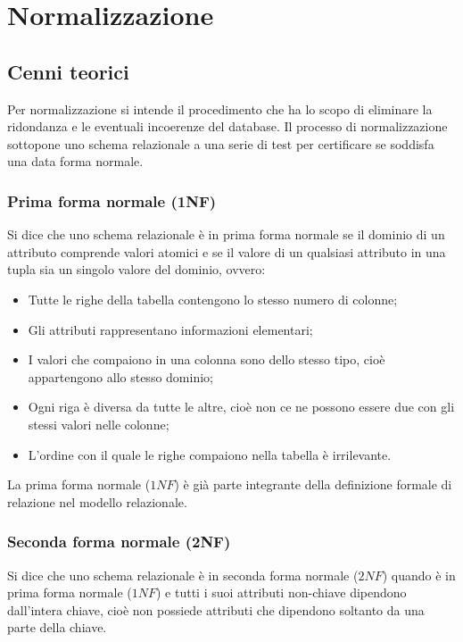 
\chapter{Normalizzazione}
\label{cap:normalizzazione}

\section{Cenni teorici}
Per normalizzazione si intende il procedimento che ha lo scopo di eliminare la ridondanza e le eventuali incoerenze del database.
Il processo di normalizzazione sottopone uno schema relazionale a una serie di test per certificare se soddisfa una data forma normale.

	\subsection{Prima forma normale (1NF)}
	Si dice che uno schema relazionale è in prima forma normale se il dominio di un attributo comprende valori atomici e se il valore di un qualsiasi attributo in una tupla sia un singolo valore del dominio, ovvero:
	\begin{itemize}
		
		\item
		Tutte le righe della tabella contengono lo stesso numero di colonne;
		
		\item
		Gli attributi rappresentano informazioni elementari;
		
		\item
		I valori che compaiono in una colonna sono dello stesso tipo, cioè appartengono allo stesso dominio;
		
		\item
		Ogni riga è diversa da tutte le altre, cioè non ce ne possono essere due con gli stessi valori nelle colonne;
		
		\item
		L'ordine con il quale le righe compaiono nella tabella è irrilevante.
		
	\end{itemize}
	La prima forma normale ($1NF$) è già parte integrante della definizione formale di relazione nel modello relazionale.
	
	\subsection{Seconda forma normale (2NF)}
	Si dice che uno schema relazionale è in seconda forma normale ($2NF$) quando è in prima forma normale ($1NF$) e tutti i suoi attributi non-chiave dipendono dall'intera chiave, cioè non possiede attributi che dipendono soltanto da una parte della chiave.
	
